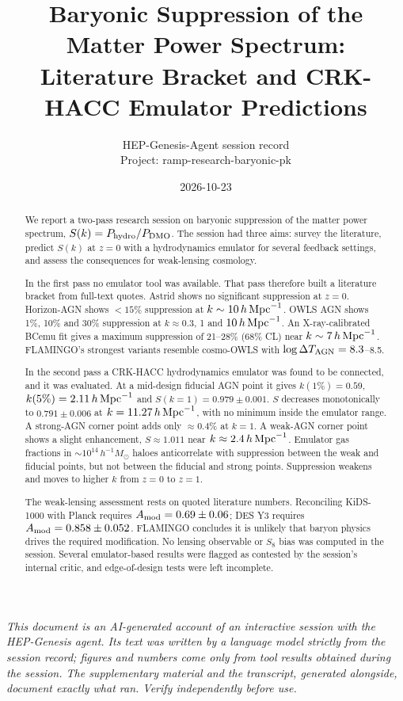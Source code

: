 \documentclass[11pt,a4paper]{article}
\title{Baryonic Suppression of the Matter Power Spectrum: Literature Bracket and CRK-HACC Emulator Predictions}
\author{HEP-Genesis-Agent session record \\ \small Project: ramp-research-baryonic-pk}
\date{2026-10-23}
\begin{document}
\maketitle
\noindent\textit{\small This document is an AI-generated account of an interactive session with the HEP-Genesis agent. Its text was written by a language model strictly from the session record; figures and numbers come only from tool results obtained during the session. The supplementary material and the transcript, generated alongside, document exactly what ran. Verify independently before use.}
\vspace{1em}

\begin{abstract}
We report a two-pass research session on baryonic suppression of the matter power spectrum, $S(k)=P_{\rm hydro}/P_{\rm DMO}$. The session had three aims: survey the literature, predict $S(k)$ at $z=0$ with a hydrodynamics emulator for several feedback settings, and assess the consequences for weak-lensing cosmology.

In the first pass no emulator tool was available. That pass therefore built a literature bracket from full-text quotes. Astrid shows no significant suppression at $z=0$. Horizon-AGN shows $<15\%$ suppression at $k\sim10\,h\,{\rm Mpc}^{-1}$. OWLS AGN shows 1\%, 10\% and 30\% suppression at $k\approx0.3$, 1 and $10\,h\,{\rm Mpc}^{-1}$. An X-ray-calibrated BCemu fit gives a maximum suppression of 21--28\% (68\% CL) near $k\sim7\,h\,{\rm Mpc}^{-1}$. FLAMINGO's strongest variants resemble cosmo-OWLS with $\log\Delta T_{\rm AGN}=8.3$--8.5.

In the second pass a CRK-HACC hydrodynamics emulator was found to be connected, and it was evaluated. At a mid-design fiducial AGN point it gives $k(1\%)=0.59$, $k(5\%)=2.11\,h\,{\rm Mpc}^{-1}$ and $S(k=1)=0.979\pm0.001$. $S$ decreases monotonically to $0.791\pm0.006$ at $k=11.27\,h\,{\rm Mpc}^{-1}$, with no minimum inside the emulator range. A strong-AGN corner point adds only $\approx0.4\%$ at $k=1$. A weak-AGN corner point shows a slight enhancement, $S\approx1.011$ near $k\approx2.4\,h\,{\rm Mpc}^{-1}$. Emulator gas fractions in $\sim10^{14}\,h^{-1}M_\odot$ haloes anticorrelate with suppression between the weak and fiducial points, but not between the fiducial and strong points. Suppression weakens and moves to higher $k$ from $z=0$ to $z=1$.

The weak-lensing assessment rests on quoted literature numbers. Reconciling KiDS-1000 with Planck requires $A_{\rm mod}=0.69\pm0.06$; DES Y3 requires $A_{\rm mod}=0.858\pm0.052$. FLAMINGO concludes it is unlikely that baryon physics drives the required modification. No lensing observable or $S_8$ bias was computed in the session. Several emulator-based results were flagged as contested by the session's internal critic, and edge-of-design tests were left incomplete.
\end{abstract}
\end{document}
